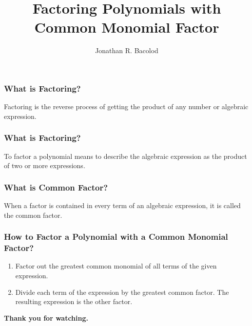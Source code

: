 \documentclass[14pt]{beamer}
\title[] {Factoring Polynomials with Common Monomial Factor}
\author{Jonathan R. Bacolod}
\institute[SHS]{Sauyo High School}
\date{}
\begin{document}
	\frame{\titlepage}
	
	\begin{frame}
		\frametitle{What is Factoring?}
		Factoring is the reverse process of getting the product of any number or algebraic	expression. 
	\end{frame}

    \begin{frame}
    	\frametitle{What is Factoring?}
    	To factor a polynomial means to describe the algebraic
    	expression as the product of two or more expressions. 
    \end{frame}

    \begin{frame}
    	\frametitle{What is Common Factor?}
    	When a factor is contained in every term of an algebraic expression, it is called the common factor. 
    \end{frame}

    \begin{frame}
    	\frametitle{How to Factor a Polynomial with a Common Monomial Factor?}
    	\begin{enumerate}
    		\item<1-> Factor out the greatest common monomial of all terms of the given expression.
    		\item<2-> Divide each term of the expression by the greatest common factor. The resulting expression is the other factor.
    	\end{enumerate} 
    \end{frame}

    \begin{frame}
    	\begin{center}
    		\textbf{\LARGE Thank you for watching.}
    	\end{center}
    \end{frame}
	
\end{document}
